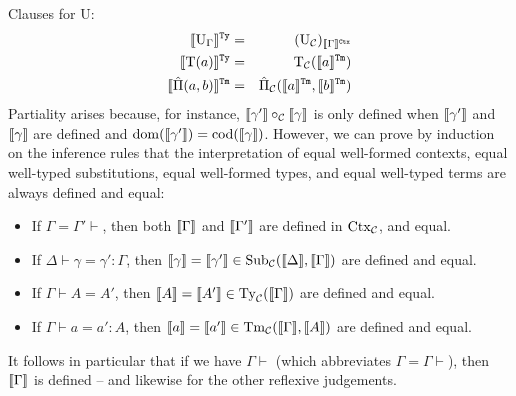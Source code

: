 \documentclass{lmcs}
\def\UU{\mathrm{U}}
\def\Ta{\mathrm{T}}
\newcommand{\intCtxU}[1]{\llbracket #1 \rrbracket^\RawCtx}
\newcommand{\intTyU}[1]{\llbracket #1 \rrbracket^\RawTy}
\newcommand{\intTmU}[1]{\llbracket #1 \rrbracket^\RawTm}
\begin{document}
Clauses for $\UU$:
\begin{eqnarray*}
\intTyU{\UU_\Gamma} &=& (\UU_\C)_{\intCtxU{\Gamma}}\\
\intTyU{\Ta(a)} &=& \Ta_\C(\intTmU{a})\\
\intTmU{\hat{\Pi}(a,b)}&=& \hat{\Pi}_\C(\intTmU{a},\intTmU{b})
\end{eqnarray*}
Partiality arises because, for instance, $\llbracket \gamma' \rrbracket \circ_{\mathcal C} {\llbracket \gamma \rrbracket}$ is only defined when $\llbracket \gamma' \rrbracket$ and $\llbracket \gamma \rrbracket$ are defined and $\operatorname{dom}(\llbracket \gamma' \rrbracket) = \operatorname{cod}(\llbracket \gamma \rrbracket)$.
However, we can prove by induction on the inference rules that the interpretation of equal well-formed contexts, equal well-typed substitutions, equal well-formed types, and equal well-typed terms are always defined and equal:
\begin{lem}\hfill
\label{lemma:interp_defined}
  \begin{itemize}
  \item If $\Gamma = \Gamma' \vdash$, then
    both $\llbracket \Gamma \rrbracket$ and $\llbracket \Gamma' \rrbracket$ are defined in $\mathrm{Ctx}_{\mathcal C}$, and equal.
  \item If $\Delta \vdash \gamma = \gamma' : \Gamma$, then
    $\llbracket \gamma \rrbracket = \llbracket \gamma' \rrbracket \in \mathrm{Sub}_{\mathcal C}(\llbracket \Delta \rrbracket,{\llbracket \Gamma \rrbracket})$ are defined and
equal.
  \item If $\Gamma \vdash A = A'$, then
    $\llbracket A \rrbracket = \llbracket A' \rrbracket \in \mathrm{Ty}_{\mathcal C}(\llbracket \Gamma \rrbracket)$ are defined and equal.
  \item If $\Gamma \vdash a = a' : A$, then
    $\llbracket a \rrbracket = \llbracket a' \rrbracket \in \mathrm{Tm}_{\mathcal C}(\llbracket \Gamma \rrbracket,\llbracket A \rrbracket)$ are defined and equal.
  \end{itemize}
\end{lem}

It follows in particular that if we have $\Gamma \vdash$ (which abbreviates $\Gamma = \Gamma \vdash$), then $\llbracket \Gamma \rrbracket$ is defined -- and likewise for the other
reflexive judgements.
\end{document}
